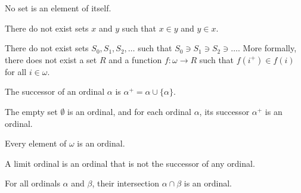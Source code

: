 \documentclass{report}
\begin{document}
\begin{corollary}
  No set is an element of itself.
\end{corollary}

\begin{corollary}
  There do not exist sets $x$ and $y$ such that $x \in y$ and $y \in x$.
\end{corollary}

\begin{corollary}
  There do not exist sets $S_0,S_1,S_2,\dots$ such that $S_0 \ni S_1 \ni S_2 \ni \dots$. More formally, there does not exist a set $R$ and a function $f:\omega \rightarrow R$ such that $f(i^+) \in f(i)$ for all $i \in \omega$.
\end{corollary}

\begin{definition}
  The successor of an ordinal $\alpha$ is $\alpha^+ = \alpha \cup \{ \alpha \}$.
\end{definition}

\begin{definition}
  The empty set $\emptyset$ is an ordinal, and for each ordinal $\alpha$, its successor $\alpha^+$ is an ordinal.
\end{definition}

\begin{corollary}
  Every element of $\omega$ is an ordinal.
\end{corollary}

\begin{definition}
  A limit ordinal is an ordinal that is not the successor of any ordinal.
\end{definition}

\begin{lemma}
   For all ordinals $\alpha$ and $\beta$, their intersection $\alpha \cap \beta$ is an ordinal.
\end{lemma}
\end{document}
